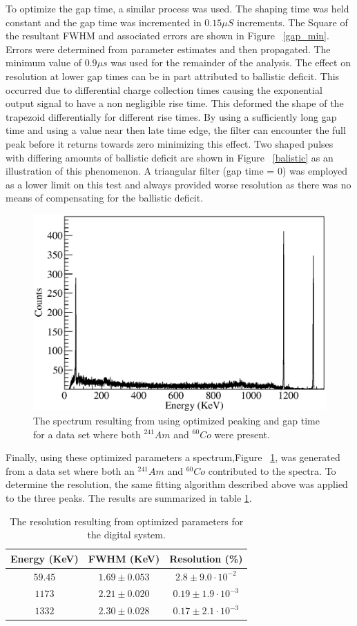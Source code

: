 \documentclass[twocolumn,preprintnumbers,superscriptaddress,amsmath,amssymb,floatfix]{revtex4-1}
\begin{document}
To optimize the gap time, a similar process was used. The shaping time was held constant and the gap time was incremented in $0.15\mu S$ increments. The Square of the resultant FWHM and associated errors are shown in Figure ~\ref{gap_min}. Errors were determined from parameter estimates and then propagated. The minimum value of $0.9\mu s$ was used for the remainder of the analysis. The effect on resolution at lower gap times can be in part attributed to ballistic deficit. This occurred due to differential charge collection times causing the exponential output signal to have a non negligible rise time. This deformed the shape of the trapezoid differentially for different rise times. By using a sufficiently long gap time and using a value near then late time edge, the filter can encounter the full peak before it returns towards zero minimizing this effect. Two shaped pulses with differing amounts of ballistic deficit are shown in Figure ~\ref{balistic} as an illustration of this phenomenon. A triangular filter (gap time = 0) was employed as a lower limit on this test and always provided worse resolution as there was no means of compensating for the ballistic deficit.




\begin{figure}[b]
\includegraphics[width=.5\textwidth]{spectrum.eps}
\caption{The spectrum resulting from using optimized peaking and gap time for a data set where both $^{241}Am$ and $^{60}Co$ were present. 
\label{spectrum}}
\end{figure}




Finally, using these optimized parameters a spectrum,Figure ~\ref{spectrum}, was generated from a data set where both an $^{241}Am$ and $^{60}Co$ contributed to the spectra. To determine the resolution, the same fitting algorithm described above was applied to the three peaks. The results are summarized in table \ref{resolution}.

\begin{table}[h!]
\caption{The resolution resulting from optimized parameters for the digital system.  
\label{resolution}}
\centering
\begin{tabular}{ccc}
\hline
Energy (KeV) & FWHM (KeV) & Resolution (\%)   \\
 \hline
$59.45$ & $1.69 \pm 0.053$ & $2.8 \pm 9.0 \cdot 10^{-2}$ \\
$1173$ & $2.21 \pm 0.020$ &$ 0.19 \pm 1.9 \cdot 10^{-3}$ \\
$1332 $& $2.30 \pm 0.028$& $0.17 \pm 2.1\cdot 10^{-3}$ \\
\hline
\end{tabular}
\end{table}
\end{document}
